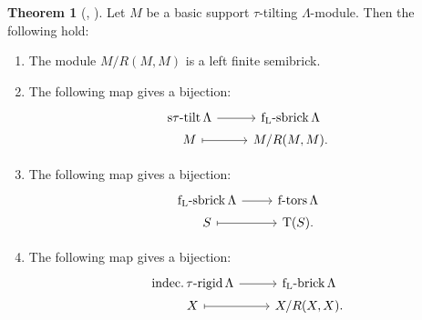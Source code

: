 \documentclass[pdftex,a4paper]{article}
\numberwithin{equation}{subsection}
\theoremstyle{definition}
\newtheorem{theorem}{Theorem}[section]
\newcommand{\setmid}{\; \middle|\;}
\newcommand{\stautilt}{\operatorname{\mathrm{s\tau-tilt}}}
\newcommand{\itaurigid}{\operatorname{\mathrm{indec.\tau-rigid}}}
\newcommand{\ftors}{\operatorname{\mathrm{f-tors}}}
\newcommand{\brick}{\operatorname{\mathrm{brick}}}
\newcommand{\flsbrick}{\operatorname{\mathrm{f_L-sbrick}}}
\newcommand{\flbrick}{\operatorname{\mathrm{f_L-brick}}}
\newcommand{\torscl}{\operatorname{\mathrm{T}}}
\begin{document}

\begin{theorem}
	[{\cite[Theorem 2.3]{MR4139031}, \cite[Theorem 4.1, Lemma 4.3]{MR3910476}}]\label{asai correspondence}
	Let \(M\) be a basic support \(\tau\)-tilting \(\Lambda\)-module. Then the following hold:
	\begin{enumerate}
		\item The module \(M/R(M,M)\) is a left finite semibrick.
		\item The following map gives a bijection:
		      \begin{equation}\label{asaicorresp}
			      \begin{tikzcd}[row sep=1pt]
				      \stautilt \Lambda \ar[r]& \flsbrick \Lambda\\
				      M \ar[r,mapsto]& M/R(M,M).
			      \end{tikzcd}
		      \end{equation}
		\item The following map gives a bijection:
		      \begin{equation}\label{TT}
			      \begin{tikzcd}[row sep=1pt]
				      \flsbrick \Lambda \ar[r]& \ftors \Lambda\\
				      S \ar[r,mapsto]& \torscl(S).
			      \end{tikzcd}
		      \end{equation}
		\item The following map gives a bijection:
		      \begin{equation}\label{2021-09-22 14:16:57}
			      \begin{tikzcd}[row sep=1pt]
				      \itaurigid \Lambda \ar[r] &\flbrick \Lambda\\
				      X \ar[r,mapsto]& X/R(X,X).
			      \end{tikzcd}
		      \end{equation}

\end{enumerate}
\end{theorem}
\end{document}
